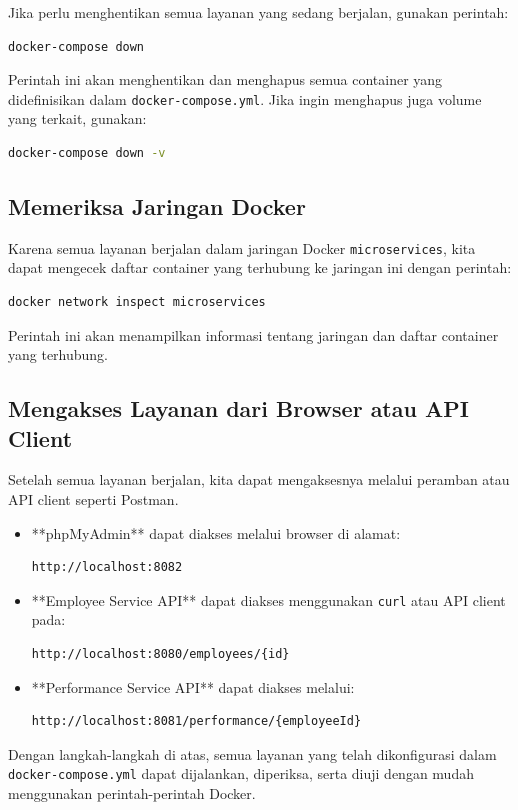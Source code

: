 Jika perlu menghentikan semua layanan yang sedang berjalan, gunakan perintah:

\begin{lstlisting}[language=bash]
	docker-compose down
\end{lstlisting}

Perintah ini akan menghentikan dan menghapus semua container yang didefinisikan dalam \texttt{docker-compose.yml}. Jika ingin menghapus juga volume yang terkait, gunakan:

\begin{lstlisting}[language=bash]
	docker-compose down -v
\end{lstlisting}

\subsection{Memeriksa Jaringan Docker}

Karena semua layanan berjalan dalam jaringan Docker \texttt{microservices}, kita dapat mengecek daftar container yang terhubung ke jaringan ini dengan perintah:

\begin{lstlisting}[language=bash]
	docker network inspect microservices
\end{lstlisting}

Perintah ini akan menampilkan informasi tentang jaringan dan daftar container yang terhubung.

\subsection{Mengakses Layanan dari Browser atau API Client}

Setelah semua layanan berjalan, kita dapat mengaksesnya melalui peramban atau API client seperti Postman.

\begin{itemize}
	\item **phpMyAdmin** dapat diakses melalui browser di alamat:
	\begin{lstlisting}[language=bash]
		http://localhost:8082
	\end{lstlisting}
	\item **Employee Service API** dapat diakses menggunakan \texttt{curl} atau API client pada:
	\begin{lstlisting}[language=bash]
		http://localhost:8080/employees/{id}
	\end{lstlisting}
	\item **Performance Service API** dapat diakses melalui:
	\begin{lstlisting}[language=bash]
		http://localhost:8081/performance/{employeeId}
	\end{lstlisting}
\end{itemize}

Dengan langkah-langkah di atas, semua layanan yang telah dikonfigurasi dalam \texttt{docker-compose.yml} dapat dijalankan, diperiksa, serta diuji dengan mudah menggunakan perintah-perintah Docker.
